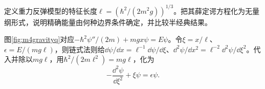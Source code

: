 \begin{exercise}\label{ex:m4gravityscale}
定义重力反弹模型的特征长度$\ell=(\hbar^2/(2m^2g))^{1/3}$。把其薛定谔方程化为无量纲形式，说明精确能量由何种边界条件确定，并比较半经典结果。
\end{exercise}
\begin{solution}
图\ref{fig:m4gravityq}对应$-\hbar^2\psi''/(2m)+mgx\psi=E\psi$。令$\xi=x/\ell$、$\epsilon=E/(mg\ell)$，则链式法则给$\dd\psi/\dd x=\ell^{-1}\dd\psi/\dd\xi$、$\dd^2\psi/\dd x^2=\ell^{-2}\dd^2\psi/\dd\xi^2$。代入并除以$mg\ell$，用$\hbar^2/(2m\ell^2)=mg\ell$，化为
\[
 -\frac{\dd^2\psi}{\dd\xi^2}+\xi\psi=\epsilon\psi.
\]

\end{solution}
